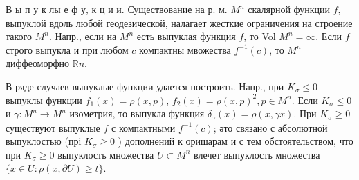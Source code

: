 \documentclass[10pt]{article}
\begin{document}
В ы п у к лы е ф у, к ц и и. Существование на р. м. $M^{n}$ скалярной функции $f$, выпуклой вдоль любой геодезической, налагает жесткие ограничения на строение такого $M^{n}$. Напр., если на $M^{n}$ есть выпуклая функция $f$, то Vol $M^{n}=\infty$. Если $f$ строго выпукла и при любом $c$ компактны мвожества $f^{-1}(c)$, то $M^{n}$ диффеоморфно $\mathbb{R} n$.



В ряде случаев выпуклые функции удается построить. Напр., при $K_{\sigma} \leqslant 0$ выпуклы функции $f_{1}(x)=\rho(x, p)$, $f_{2}(x)=\rho(x, p)^{2}, p \in M^{n}$. Если $K_{\sigma} \leqslant 0$ и $\gamma: M^{n} \rightarrow M^{n}$ изометрия, то выпукла функция $\delta_{\gamma}(x)=\rho(x, \gamma x)$. При $K_{\sigma} \geqslant 0$ существуют выпуклые $f$ с компактными $f^{-1}(c)$; әто связано с абсолютной выпуклостью (прі $K_{\sigma} \geqslant 0$ ) дополнений к оришарам и с тем обстоятельством, что при $K_{\sigma} \geqslant 0$ выпуклость множества $U \subset M^{n}$ влечет выпуклость множества $\{x \in U: \rho(x, \partial U) \geqslant t\}$.
\end{document}

